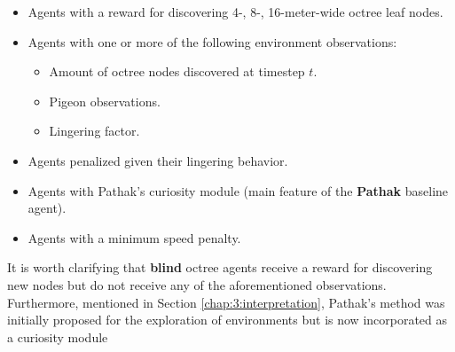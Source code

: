 \begin{itemize}
    \item Agents with a reward for discovering 4-, 8-, 16-meter-wide octree leaf nodes.
    \item Agents with one or more of the following environment observations:
    \begin{itemize}
        \item Amount of octree nodes discovered at timestep $t$.
        \item Pigeon observations.
        \item Lingering factor.
    \end{itemize}

    \item Agents penalized given their lingering behavior.
    \item Agents with Pathak's curiosity module (main feature of the \textbf{Pathak} baseline agent).
    \item Agents with a minimum speed penalty.
\end{itemize}

It is worth clarifying that \textbf{blind} octree agents receive a reward for discovering new nodes but do not receive any of the aforementioned observations. Furthermore, mentioned in Section \ref{chap:3:interpretation}, Pathak's method was initially proposed for the exploration of environments but is now incorporated as a curiosity module


